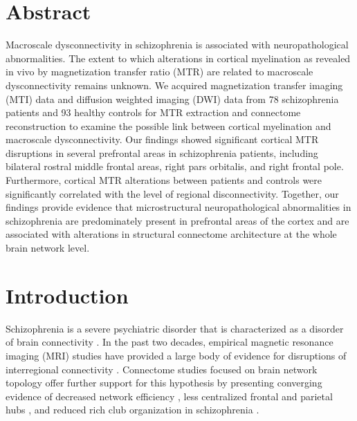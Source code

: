 \begin{refsection}
\newpage
\section*{Abstract}
Macroscale dysconnectivity in schizophrenia is associated with neuropathological abnormalities. The extent to which alterations in cortical myelination as revealed in vivo by magnetization transfer ratio (MTR) are related to macroscale dysconnectivity remains unknown. We acquired magnetization transfer imaging (MTI) data and diffusion weighted imaging (DWI) data from 78 schizophrenia patients and 93 healthy controls for MTR extraction and connectome reconstruction to examine the possible link between cortical myelination and macroscale dysconnectivity. Our findings showed significant cortical MTR disruptions in several prefrontal areas in schizophrenia patients, including bilateral rostral middle frontal areas, right pars orbitalis, and right frontal pole. Furthermore, cortical MTR alterations between patients and controls were significantly correlated with the level of regional disconnectivity. Together, our findings provide evidence that microstructural neuropathological abnormalities in schizophrenia are predominately present in prefrontal areas of the cortex and are associated with alterations in structural connectome architecture at the whole brain network level.

\section*{Introduction}
Schizophrenia is a severe psychiatric disorder that is characterized as a disorder of brain connectivity \citep{Fornito2012SchizophreniaNA,Stephan2009DysconnectionIS,Heuvel2014BrainNI}. In the past two decades, empirical magnetic resonance imaging (MRI) studies have provided a large body of evidence for disruptions of interregional connectivity \citep{EllisonWright2009MetaanalysisOD,Fornito2012SchizophreniaNA,Klauser2017WhiteMD,Fitzsimmons2013ReviewOF}. Connectome studies focused on brain network topology offer further support for this hypothesis by presenting converging evidence of decreased network efficiency \citep{Zalesky2011DisruptedAF}, less centralized frontal and parietal hubs \citep{vanDenHeuvel2010AberrantFA}, and reduced rich club organization in schizophrenia \citep{Collin2014ImpairedRC,vanDenHeuvel2013AbnormalRC}.


\end{refsection}
